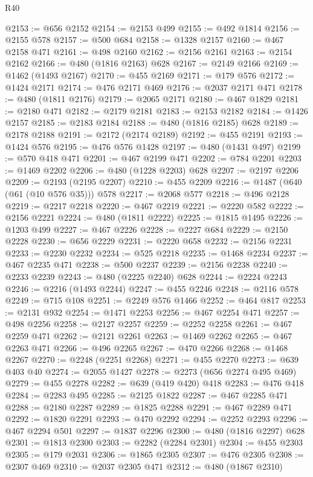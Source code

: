 \begin{lexlean}{R40}
\begin{coremodule}
@2153 := @656 @2152
@2154 := @2153 @499
@2155 := @492 @1814
@2156 := @2155 @578
@2157 := @500 @684
@2158 := @1328 @2157
@2160 := @467 @2158 @471
@2161 := @498 @2160
@2162 := @2156 @2161
@2163 := @2154 @2162
@2166 := @480 (@1816 @2163) @628
@2167 := @2149 @2166
@2169 := @1462 (@1493 @2167)
@2170 := @455 @2169
@2171 := @179 @576
@2172 := @1424 @2171
@2174 := @476 @2171 @469
@2176 := @2037 @2171 @471
@2178 := @480 (@1811 @2176)
@2179 := @2065 @2171
@2180 := @467 @1829
@2181 := @2180 @471
@2182 := @2179 @2181
@2183 := @2153 @2182
@2184 := @1426 @2157
@2185 := @2183 @2184
@2188 := @480 (@1816 @2185) @628
@2189 := @2178 @2188
@2191 := @2172 (@2174 @2189)
@2192 := @455 @2191
@2193 := @1424 @576
@2195 := @476 @576 @1428
@2197 := @480 (@1431 @497)
@2199 := @570 @418 @471
@2201 := @467 @2199 @471
@2202 := @784 @2201
@2203 := @1469 @2202
@2206 := @480 (@1228 @2203) @628
@2207 := @2197 @2206
@2209 := @2193 (@2195 @2207)
@2210 := @455 @2209
@2216 := @1487 (@640 (@61 (@10 @576 @35))) @578
@2217 := @2068 @577
@2218 := @496 @2128
@2219 := @2217 @2218
@2220 := @467 @2219
@2221 := @2220 @582
@2222 := @2156 @2221
@2224 := @480 (@1811 @2222)
@2225 := @1815 @1495
@2226 := @1203 @499
@2227 := @467 @2226
@2228 := @2227 @684
@2229 := @2150 @2228
@2230 := @656 @2229
@2231 := @2220 @658
@2232 := @2156 @2231
@2233 := @2230 @2232
@2234 := @525 @2218
@2235 := @1468 @2234
@2237 := @467 @2235 @471
@2238 := @500 @2237
@2239 := @2156 @2238
@2240 := @2233 @2239
@2243 := @480 (@2225 @2240) @628
@2244 := @2224 @2243
@2246 := @2216 (@1493 @2244)
@2247 := @455 @2246
@2248 := @2116 @578
@2249 := @715 @108
@2251 := @2249 @576 @1466
@2252 := @464 @817
@2253 := @2131 @932
@2254 := @1471 @2253
@2256 := @467 @2254 @471
@2257 := @498 @2256
@2258 := @2127 @2257
@2259 := @2252 @2258
@2261 := @467 @2259 @471
@2262 := @2121 @2261
@2263 := @1469 @2262
@2265 := @467 @2263 @471
@2266 := @496 @2265
@2267 := @470 @2266
@2268 := @1468 @2267
@2270 := @2248 (@2251 @2268)
@2271 := @455 @2270
@2273 := @639 @403 @40
@2274 := @2055 @1427
@2278 := @2273 (@656 @2274 @495 @469)
@2279 := @455 @2278
@2282 := @639 (@419 @420) @418
@2283 := @476 @418
@2284 := @2283 @495
@2285 := @2125 @1822
@2287 := @467 @2285 @471
@2288 := @2180 @2287
@2289 := @1825 @2288
@2291 := @467 @2289 @471
@2292 := @1820 @2291
@2293 := @470 @2292
@2294 := @2252 @2293
@2296 := @467 @2294 @501
@2297 := @1837 @2296
@2300 := @480 (@1816 @2297) @628
@2301 := @1813 @2300
@2303 := @2282 (@2284 @2301)
@2304 := @455 @2303
@2305 := @179 @2031
@2306 := @1865 @2305
@2307 := @476 @2305
@2308 := @2307 @469
@2310 := @2037 @2305 @471
@2312 := @480 (@1867 @2310)

\end{coremodule}
\end{lexlean}
